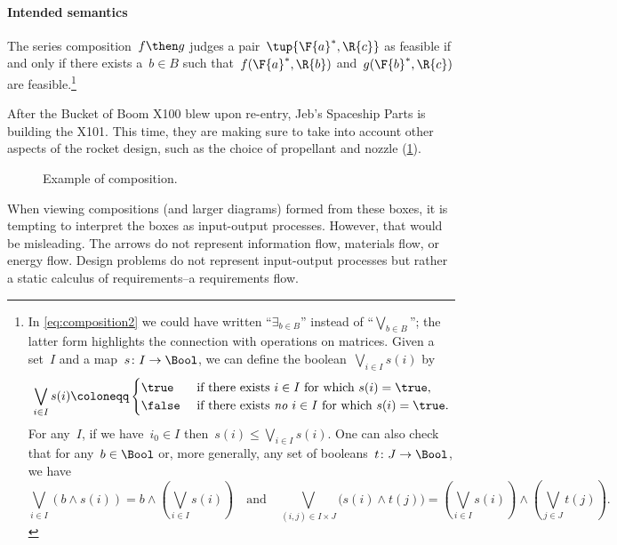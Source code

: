 \paragraph{Intended semantics}
The series composition~$f\then g$ judges a pair~$\tup{\F{a}^*,\R{c}}$ as feasible if and only if there exists a~$b \in B$ such that~$f(\F{a}^*,\R{b})$ and~$g(\F{b}^*,\R{c})$ are feasible.\footnote{In \eqref{eq:composition2} we could have written ``$\exists_{b\in B}$''
instead of ``$\bigvee_{b\in B}$''; the latter form highlights the connection
with operations on matrices. Given a set~$I$ and a map~$s\colon I\to\Bool$, we can define the boolean~$\bigvee_{i\in I}s(i)$ by
\begin{equation*}
 \bigvee_{i\in I}s(i)\coloneqq
 \begin{cases}
 	\true&\text{ if there exists }i\in I\text{ for which }s(i)=\true,\\
 	\false&\text{ if there exists \emph{no} }i\in I\text{ for which }s(i)=\true.
 \end{cases}
 \end{equation*}
 For any~$I$, if we have~$i_0\in I$ then~$s(i)\leq\bigvee_{i\in I}s(i)$. One can also check that for any~$b\in\Bool$ or, more generally, any set of booleans~$t\colon J\to\Bool$, we have
 \begin{equation*}
     \bigvee_{i\in I}(b\wedge s(i))=b\wedge\left(\bigvee_{i\in I}s(i)\right)
 \quad\text{and}\quad
 \bigvee_{(i,j)\in I\times  J}\big(s(i)\wedge t(j)\big)=\left(\bigvee_{i\in I}s(i)\right)\wedge\left(\bigvee_{j\in J} t(j)\right).
 \end{equation*}
}

\begin{example}
After the Bucket of Boom X100 blew upon re-entry, Jeb's Spaceship Parts is building the X101. This time, they are making sure to take into account other aspects of the rocket design, such as the choice of propellant and nozzle (\cref{fig:examplecomposition}).
\begin{figure}[h!]
\begin{center}
\end{center}
\caption{Example of composition. \label{fig:examplecomposition}}
\end{figure}
\end{example}

\begin{remark}
When viewing compositions (and larger diagrams) formed from these boxes, it is tempting to interpret the boxes as input-output processes. However, that would be misleading. The arrows do not represent information flow, materials flow, or energy flow. Design problems do not represent input-output processes but rather a static calculus of requirements--a requirements flow.
\end{remark}

